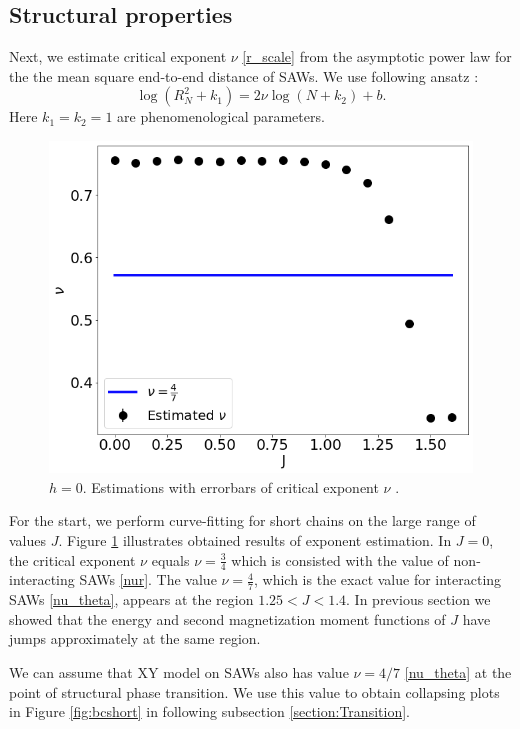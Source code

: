 \subsection{Structural properties}

Next, we estimate critical exponent $\nu$ \eqref{r_scale} from the asymptotic power law for the the mean square end-to-end distance of SAWs. We use following ansatz  \cite{Berretti1985}:
\begin{equation}
\label{berettiscale}
\log (R_N^2+k_1 ) = 2 \nu \log (N+k_2) + b.
\end{equation}
Here $k_1=k_2=1$ are phenomenological parameters. 
 \begin{figure}[H]
	\centering
	\includegraphics[scale=0.36]{Images/nu_shortchains.png}
	\caption{$h=0$. Estimations with errorbars of critical exponent $\nu$ .   }
	\label{fig:nushort}
\end{figure}
 

For the start, we perform curve-fitting for short chains on the large range of values $J$. Figure \ref{fig:nushort} illustrates obtained results of exponent estimation. In $J=0$, the critical exponent $\nu$ equals $\nu = \frac{3}{4}$  which is consisted with the value of non-interacting SAWs \eqref{nur}. The value $\nu=\frac{4}{7}$, which is the exact value
for interacting SAWs \eqref{nu_theta}, appears at the region $ 1.25 < J < 1.4$. In previous section we showed that the energy and second magnetization moment functions of $J$ have jumps approximately at the same region. 

  We can assume that XY model on SAWs also has value $\nu = 4/7$ \eqref{nu_theta} at the point of structural phase transition. We use this value to obtain collapsing plots in Figure \ref{fig:bcshort} in following subsection \ref{section:Transition}. 

